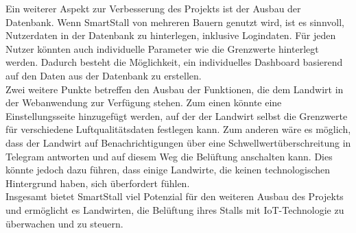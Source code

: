\documentclass[conference]{IEEEtran}
\begin{document}
Ein weiterer Aspekt zur Verbesserung des Projekts ist der Ausbau der Datenbank. Wenn SmartStall von mehreren Bauern genutzt wird, ist es sinnvoll, Nutzerdaten in der Datenbank zu hinterlegen, inklusive Logindaten. Für jeden Nutzer könnten auch individuelle Parameter wie die Grenzwerte hinterlegt werden. Dadurch besteht die Möglichkeit, ein individuelles Dashboard basierend auf den Daten aus der Datenbank zu erstellen. \\
Zwei weitere Punkte betreffen den Ausbau der Funktionen, die dem Landwirt in der Webanwendung zur Verfügung stehen. Zum einen könnte eine Einstellungsseite hinzugefügt werden, auf der der Landwirt selbst die Grenzwerte für verschiedene Luftqualitätsdaten festlegen kann. Zum anderen wäre es möglich, dass der Landwirt auf Benachrichtigungen über eine Schwellwertüberschreitung in Telegram antworten und auf diesem Weg die Belüftung anschalten kann. Dies könnte jedoch dazu führen, dass einige Landwirte, die keinen technologischen Hintergrund haben, sich überfordert fühlen. \\
Insgesamt bietet SmartStall viel Potenzial für den weiteren Ausbau des Projekts und ermöglicht es Landwirten, die Belüftung ihres Stalls mit IoT-Technologie zu überwachen und zu steuern.
\end{document}
